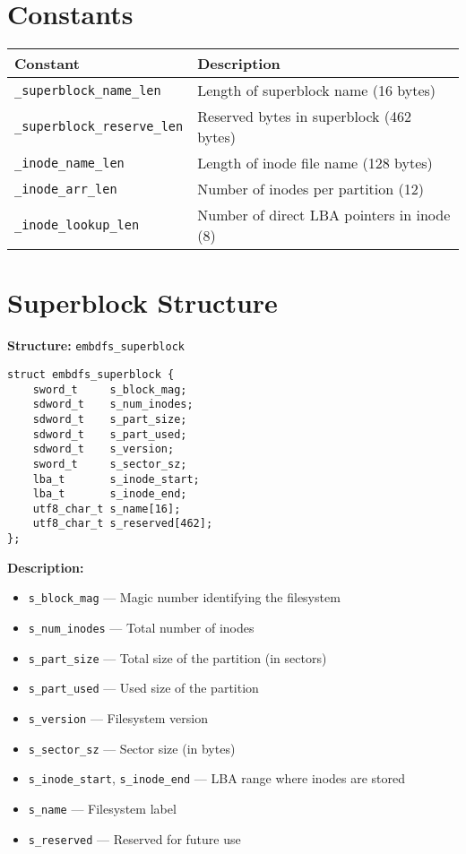 \documentclass{article}
\begin{document}
\section{Constants}
\begin{longtable}{|l|l|}
\hline
\textbf{Constant} & \textbf{Description} \\
\hline
\texttt{\_superblock\_name\_len} & Length of superblock name (16 bytes) \\
\texttt{\_superblock\_reserve\_len} & Reserved bytes in superblock (462 bytes) \\
\texttt{\_inode\_name\_len} & Length of inode file name (128 bytes) \\
\texttt{\_inode\_arr\_len} & Number of inodes per partition (12) \\
\texttt{\_inode\_lookup\_len} & Number of direct LBA pointers in inode (8) \\
\hline
\end{longtable}

\section{Superblock Structure}
\textbf{Structure:} \texttt{embdfs\_superblock}
\begin{lstlisting}
struct embdfs_superblock {
    sword_t     s_block_mag;
    sdword_t    s_num_inodes;
    sdword_t    s_part_size;
    sdword_t    s_part_used;
    sdword_t    s_version;
    sword_t     s_sector_sz;
    lba_t       s_inode_start;
    lba_t       s_inode_end;
    utf8_char_t s_name[16];
    utf8_char_t s_reserved[462];
};
\end{lstlisting}

\textbf{Description:}
\begin{itemize}
    \item \texttt{s\_block\_mag} — Magic number identifying the filesystem
    \item \texttt{s\_num\_inodes} — Total number of inodes
    \item \texttt{s\_part\_size} — Total size of the partition (in sectors)
    \item \texttt{s\_part\_used} — Used size of the partition
    \item \texttt{s\_version} — Filesystem version
    \item \texttt{s\_sector\_sz} — Sector size (in bytes)
    \item \texttt{s\_inode\_start}, \texttt{s\_inode\_end} — LBA range where inodes are stored
    \item \texttt{s\_name} — Filesystem label
    \item \texttt{s\_reserved} — Reserved for future use
\end{itemize}
\end{document}
